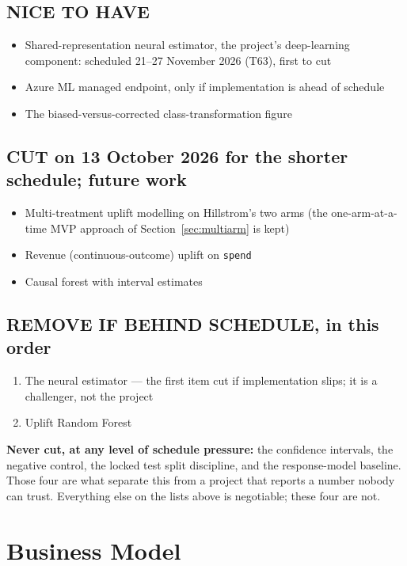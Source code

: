 \documentclass[11pt,a4paper]{article}
\begin{document}
\subsection{NICE TO HAVE}
\begin{itemize}
\item Shared-representation neural estimator, the project's deep-learning component: scheduled
21--27 November 2026 (T63), first to cut
\item Azure ML managed endpoint, only if implementation is ahead of schedule
\item The biased-versus-corrected class-transformation figure
\end{itemize}

\subsection{CUT on 13 October 2026 for the shorter schedule; future work}
\begin{itemize}
\item Multi-treatment uplift modelling on Hillstrom's two arms (the one-arm-at-a-time MVP approach
of Section~\ref{sec:multiarm} is kept)
\item Revenue (continuous-outcome) uplift on \texttt{spend}
\item Causal forest with interval estimates
\end{itemize}

\subsection{REMOVE IF BEHIND SCHEDULE, in this order}
\begin{enumerate}
\item The neural estimator --- the first item cut if implementation slips; it is a challenger, not
the project
\item Uplift Random Forest
\end{enumerate}

\begin{alertbox}
\textbf{Never cut, at any level of schedule pressure:} the confidence intervals, the negative
control, the locked test split discipline, and the response-model baseline. Those four are what
separate this from a project that reports a number nobody can trust. Everything else on the lists
above is negotiable; these four are not.
\end{alertbox}

\section{Business Model}
\end{document}
